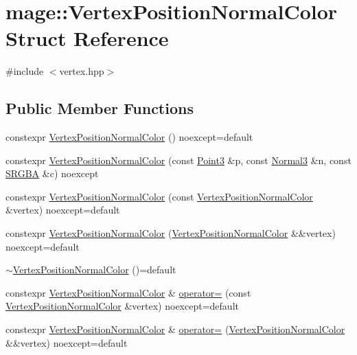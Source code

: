 \hypertarget{structmage_1_1_vertex_position_normal_color}{}\section{mage\+:\+:Vertex\+Position\+Normal\+Color Struct Reference}
\label{structmage_1_1_vertex_position_normal_color}


{\ttfamily \#include $<$vertex.\+hpp$>$}

\subsection*{Public Member Functions}
\begin{DoxyCompactItemize}
\item 
constexpr \hyperlink{structmage_1_1_vertex_position_normal_color_a427387ac9b0e28c85c03eeab1796ae09}{Vertex\+Position\+Normal\+Color} () noexcept=default
\item 
constexpr \hyperlink{structmage_1_1_vertex_position_normal_color_a5098d027d69c0454b2754411614e181b}{Vertex\+Position\+Normal\+Color} (const \hyperlink{structmage_1_1_point3}{Point3} \&p, const \hyperlink{structmage_1_1_normal3}{Normal3} \&n, const \hyperlink{structmage_1_1_s_r_g_b_a}{S\+R\+G\+BA} \&c) noexcept
\item 
constexpr \hyperlink{structmage_1_1_vertex_position_normal_color_a6679da0ba4c160068124899bb7a4b8d7}{Vertex\+Position\+Normal\+Color} (const \hyperlink{structmage_1_1_vertex_position_normal_color}{Vertex\+Position\+Normal\+Color} \&vertex) noexcept=default
\item 
constexpr \hyperlink{structmage_1_1_vertex_position_normal_color_ad6d07a23a4fc2ad7694e666163ed2a78}{Vertex\+Position\+Normal\+Color} (\hyperlink{structmage_1_1_vertex_position_normal_color}{Vertex\+Position\+Normal\+Color} \&\&vertex) noexcept=default
\item 
\hyperlink{structmage_1_1_vertex_position_normal_color_a4c51d0599843601d1cc1a6a55149aafe}{$\sim$\+Vertex\+Position\+Normal\+Color} ()=default
\item 
constexpr \hyperlink{structmage_1_1_vertex_position_normal_color}{Vertex\+Position\+Normal\+Color} \& \hyperlink{structmage_1_1_vertex_position_normal_color_aa2af425d22686e8d7eac31b88eb00792}{operator=} (const \hyperlink{structmage_1_1_vertex_position_normal_color}{Vertex\+Position\+Normal\+Color} \&vertex) noexcept=default
\item 
constexpr \hyperlink{structmage_1_1_vertex_position_normal_color}{Vertex\+Position\+Normal\+Color} \& \hyperlink{structmage_1_1_vertex_position_normal_color_a05270c6feff508dced4d82cda4fda0f6}{operator=} (\hyperlink{structmage_1_1_vertex_position_normal_color}{Vertex\+Position\+Normal\+Color} \&\&vertex) noexcept=default
\end{DoxyCompactItemize}
